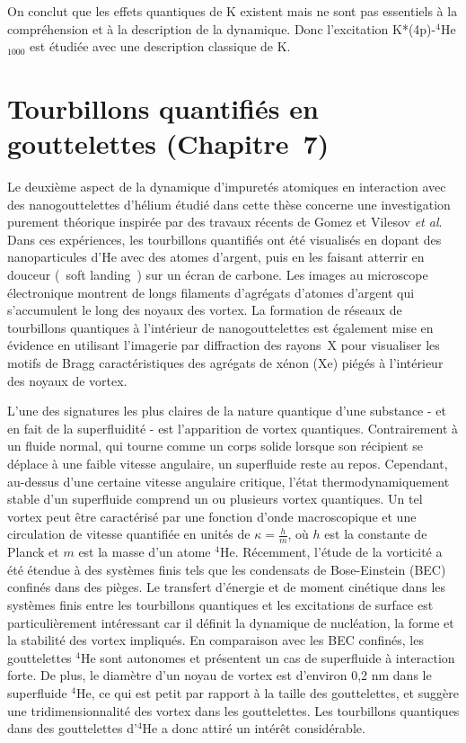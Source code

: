 		On conclut que les effets quantiques de K existent mais ne sont pas essentiels à la compréhension et à la description de la dynamique. 
		Donc l'excitation K*(4p)-$^4$He$_{1000}$ est étudiée avec une description classique de K.

	\section*{Tourbillons quantifiés en gouttelettes \small(Chapitre~7)}
		Le deuxième aspect de la dynamique d'impuretés atomiques en interaction avec des nanogouttelettes d'hélium étudié dans cette thèse concerne une investigation purement théorique inspirée par des travaux récents de Gomez et Vilesov \emph{et al}.
		Dans ces expériences, les tourbillons quantifiés ont été visualisés en dopant des nanoparticules d'He avec des atomes d'argent, puis en les faisant atterrir en douceur (\guillemotleft~soft landing~\guillemotright{}) sur un écran de carbone. 
		Les images au microscope électronique montrent de longs filaments d'agrégats d'atomes d'argent qui s'accumulent le long des noyaux des vortex. 
		La formation de réseaux de tourbillons quantiques à l'intérieur de nanogouttelettes est également mise en évidence en utilisant l'imagerie par diffraction des rayons~X pour visualiser les motifs de Bragg caractéristiques des agrégats de xénon (Xe) piégés à l'intérieur des noyaux de vortex.
		
		L'une des signatures les plus claires de la nature quantique d'une substance - et en fait de la superfluidité - est l'apparition de vortex quantiques. 
		Contrairement à un fluide normal, qui tourne comme un corps solide lorsque son récipient se déplace à une faible vitesse angulaire, un superfluide reste au repos. 
		Cependant, au-dessus d'une certaine vitesse angulaire critique, l'état thermodynamiquement stable d'un superfluide comprend un ou plusieurs vortex quantiques. 
		Un tel vortex peut être caractérisé par une fonction d'onde macroscopique et une circulation de vitesse quantifiée en unités de $\kappa=\frac{h}{m}$, où $h$ est la constante de Planck et $m$ est la masse d'un atome $^4$He\citep{Don91,Pit03}. 
		Récemment, l'étude de la vorticité a été étendue à des systèmes finis tels que les condensats de Bose-Einstein (BEC) confinés dans des pièges\citep{Pit03,Fetter2009}. 
		Le transfert d'énergie et de moment cinétique dans les systèmes finis entre les tourbillons quantiques et les excitations de surface est particulièrement intéressant car il définit la dynamique de nucléation, la forme et la stabilité des vortex impliqués\citep{Pit03,Fetter2009}. 
		En comparaison avec les BEC confinés, les gouttelettes $^4$He sont autonomes et présentent un cas de superfluide à interaction forte. 
		De plus, le diamètre d'un noyau de vortex est d'environ 0,2 nm dans le superfluide $^4$He\citep{Don91}, ce qui est petit par rapport à la taille des gouttelettes, et suggère une tridimensionnalité des vortex dans les gouttelettes. 
		Les tourbillons quantiques dans des  gouttelettes d'$^4$He a donc attiré un intérêt considérable\citep{Clo98,Lehmann2003,Bar06,Sti06}.
		
